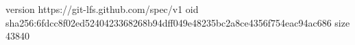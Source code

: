version https://git-lfs.github.com/spec/v1
oid sha256:6fdcc8f02ed5240423368268b94dff049e48235bc2a8ce4356f754eac94ac686
size 43840
